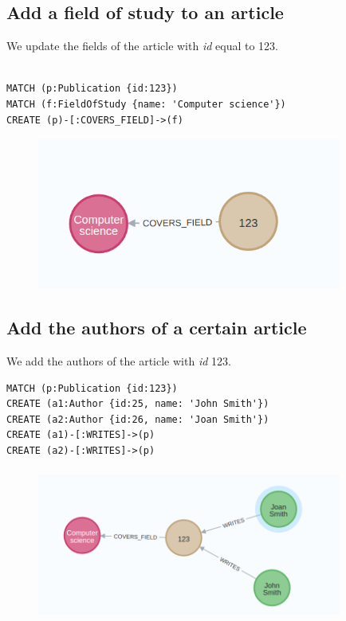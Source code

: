 \documentclass{Configuration_Files/PoliMi3i_thesis}
\begin{document}
\subsection{Add a field of study to an article}
We update the fields of the article with \textit{id} equal to 123.\\\\
\begin{lstlisting}[language=cypher, label=lst:cypher-example]
MATCH (p:Publication {id:123}) 
MATCH (f:FieldOfStudy {name: 'Computer science'})
CREATE (p)-[:COVERS_FIELD]->(f)
\end{lstlisting}
\begin{figure}[H]
    \centering
    \includegraphics[width=100mm, height=50mm]{Images/create_2.png}
        \caption{}
    \label{fig:quadtree}
\end{figure}
\subsection{Add the authors of a certain article}
We add the authors of the article with \textit{id} 123.\\
\begin{lstlisting}[language=cypher, label=lst:cypher-example]
MATCH (p:Publication {id:123})
CREATE (a1:Author {id:25, name: 'John Smith'})
CREATE (a2:Author {id:26, name: 'Joan Smith'})
CREATE (a1)-[:WRITES]->(p)
CREATE (a2)-[:WRITES]->(p)
\end{lstlisting}
\begin{figure}[H]
    \centering
    \includegraphics[width=100mm, height=50mm]{Images/create_3.png}
        \caption{}
    \label{fig:quadtree}
\end{figure}
\end{document}
